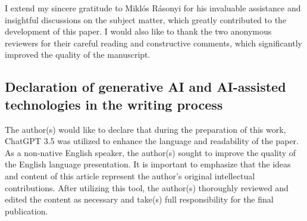 \documentclass[a4paper,10pt]{article}
\begin{document}
I extend my sincere gratitude to Miklós Rásonyi for his invaluable assistance and insightful discussions on the subject matter, which greatly contributed to the development of this paper. I would also like to thank the two anonymous reviewers for their careful reading and constructive comments, which significantly improved the quality of the manuscript.


\subsection*{Declaration of generative AI and AI-assisted technologies in the writing process}

The author(s) would like to declare that during the preparation of this work, ChatGPT 3.5 was utilized to enhance the language and readability of the paper. As a non-native English speaker, the author(s) sought to improve the quality of the English language presentation. It is important to emphasize that the ideas and content of this article represent the author's original intellectual contributions. After utilizing this tool, the author(s) thoroughly reviewed and edited the content as necessary and take(s) full responsibility for the final publication.


%
%
\end{document}

